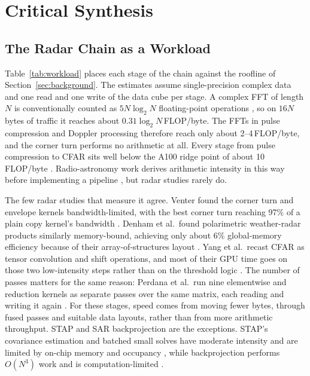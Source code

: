 \section{Critical Synthesis}
\label{sec:synthesis}
\subsection{The Radar Chain as a Workload}
\label{sec:workload}

Table~\ref{tab:workload} places each stage of the chain against the roofline of Section~\ref{sec:background}.
The estimates assume single-precision complex data and one read and one write of the data cube per stage.
A complex FFT of length $N$ is conventionally counted as $5N\log_2N$ floating-point operations \cite{cooleyAlgorithmMachineCalculation1965, frigoDesignImplementationFFTW32005},
so on $16N$ bytes of traffic it reaches about $0.31\log_2N$\,FLOP/byte.
The FFTs in pulse compression and Doppler processing therefore reach only about 2--4\,FLOP/byte,
and the corner turn performs no arithmetic at all.
Every stage from pulse compression to CFAR sits well below the A100 ridge point of about 10\,FLOP/byte \cite{nvidiaA100TensorCore2020}.
Radio-astronomy work derives arithmetic intensity in this way before implementing a pipeline \cite{vannieuwpoortCorrelatingRadioAstronomy2011},
but radar studies rarely do.

The few radar studies that measure it agree.
Venter found the corner turn and envelope kernels bandwidth-limited,
with the best corner turn reaching 97\% of a plain copy kernel's bandwidth \cite{venterSOFTWAREDEFINEDPULSEDOPPLERRADAR}.
Denham et al.\ found polarimetric weather-radar products similarly memory-bound,
achieving only about 6\% global-memory efficiency because of their array-of-structures layout \cite{denhamWeatherRadarData2018a}.
Yang et al.\ recast CFAR as tensor convolution and shift operations,
and most of their GPU time goes on those two low-intensity steps rather than on the threshold logic \cite{yangGPUOrientedDesignsConstant2022a}.
The number of passes matters for the same reason:
Perdana et al.\ run nine elementwise and reduction kernels as separate passes over the same matrix,
each reading and writing it again \cite{perdanaRadarSignalProcessing2019}.
For these stages, speed comes from moving fewer bytes, through fused passes and suitable data layouts,
rather than from more arithmetic throughput.
STAP and SAR backprojection are the exceptions.
STAP's covariance estimation and batched small solves have moderate intensity and are limited by on-chip memory and occupancy \cite{bensonGPUbasedSpacetimeAdaptive2013a},
while backprojection performs $O(N^3)$ work and is computation-limited \cite{leeArchitectureExplorationBackprojection2021a}.

